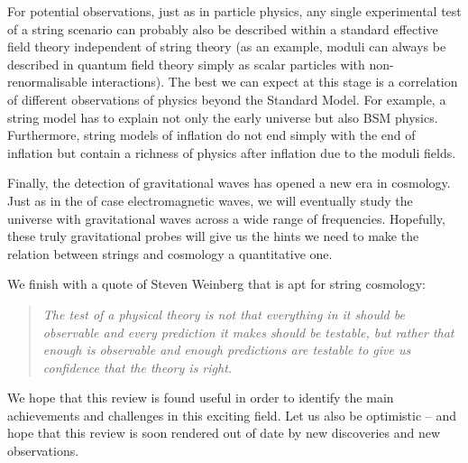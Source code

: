For potential observations, just as in particle physics, any single experimental test of a string scenario can probably also be described within a standard effective field theory independent of string theory (as an example, moduli can always be described in quantum field theory simply as scalar particles with non-renormalisable interactions). The best we can expect at this stage is a correlation of different observations of physics beyond the Standard Model. For example, a string model has to explain not only the early universe but also BSM physics. Furthermore, string models of inflation do not end simply with the end of inflation but contain a richness of physics after inflation due to the moduli fields.   
  
 Finally, the detection of gravitational waves has opened a new era in cosmology. Just
 as in  the of case electromagnetic waves, we will eventually study the universe with gravitational waves across a wide range of frequencies.  Hopefully, these truly gravitational probes will give us the hints we need to make the relation between strings and cosmology a quantitative one.
 
 We finish with a quote of Steven Weinberg that is apt for string cosmology: 
 
 \begin{quote}{\it The test of a physical theory is not that everything in it should be observable and every prediction it makes should be testable, but rather that enough is observable and enough predictions are testable to give us confidence that the theory is right.}
 \end{quote} %
   
We hope that this review is found useful in order to identify the main achievements and challenges in this exciting field. Let us also be optimistic
-- and hope that this review is soon rendered out of date by new discoveries and new observations. 
 
